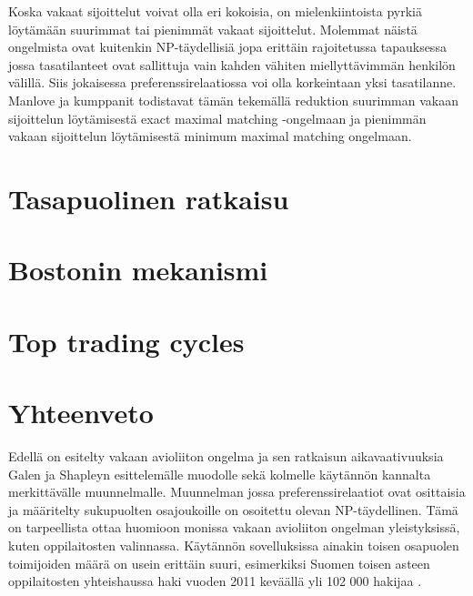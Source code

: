 \documentclass[gradu, twoside]{tktltiki}
\begin{document}
Koska vakaat sijoittelut voivat olla eri kokoisia, on mielenkiintoista
pyrkiä löytämään suurimmat tai pienimmät vakaat sijoittelut. Molemmat
näistä ongelmista ovat kuitenkin NP-täydellisiä jopa erittäin
rajoitetussa tapauksessa jossa tasatilanteet ovat sallittuja vain
kahden vähiten miellyttävimmän henkilön välillä. Siis jokaisessa
preferenssirelaatiossa voi olla korkeintaan yksi tasatilanne. Manlove
ja kumppanit todistavat tämän tekemällä reduktion suurimman vakaan
sijoittelun löytämisestä exact maximal matching -ongelmaan ja
pienimmän vakaan sijoittelun löytämisestä minimum maximal matching
ongelmaan. \cite{manlove02}

\section{Tasapuolinen ratkaisu}

\section{Bostonin mekanismi}

\section{Top trading cycles}

\section{Yhteenveto}

Edellä on esitelty vakaan avioliiton ongelma ja sen ratkaisun
aikavaativuuksia Galen ja Shapleyn esittelemälle muodolle sekä
kolmelle käytännön kannalta merkittävälle muunnelmalle. Muunnelman
jossa preferenssirelaatiot ovat osittaisia ja määritelty sukupuolten
osajoukoille on osoitettu olevan NP-täydellinen. Tämä on tarpeellista
ottaa huomioon monissa vakaan avioliiton ongelman yleistyksissä, kuten
oppilaitosten valinnassa. Käytännön sovelluksissa ainakin toisen
osapuolen toimijoiden määrä on usein erittäin suuri, esimerkiksi
Suomen toisen asteen oppilaitosten yhteishaussa haki vuoden 2011
keväällä yli 102 000 hakijaa \cite{OPH12}.
\end{document}

